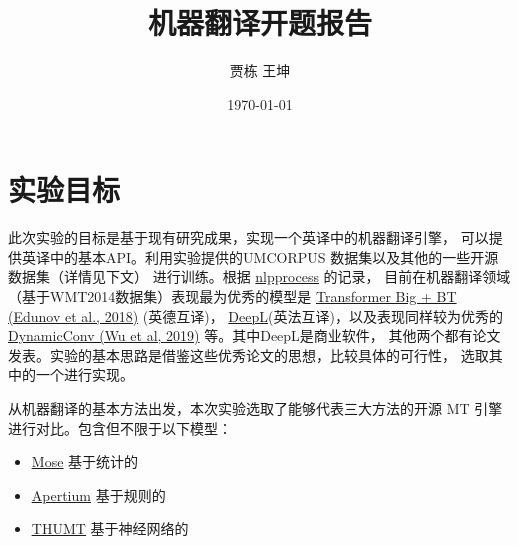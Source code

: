 \documentclass[UTF8,a4paper,10pt]{ctexart}
\title{\textbf{机器翻译开题报告}}
\author{贾栋\; 王坤}
\date{\today}
\begin{document}
    \maketitle


\begingroup %
\color{black}%
\renewcommand{\contentsname}{目录}
\tableofcontents
\newpage
\endgroup   %
 


\section{实验目标}


此次实验的目标是基于现有研究成果，实现一个英译中的机器翻译引擎，
可以提供英译中的基本API。利用实验提供的UMCORPUS 数据集以及其他的一些开源数据集（详情见下文）
进行训练。根据 \href{http://nlpprogress.com/english/machine_translation.html}{\color{blue}nlpprocess} 的记录，
目前在机器翻译领域（基于WMT2014数据集）表现最为优秀的模型是 \href{https://arxiv.org/pdf/1808.09381.pdf}{\color{blue}Transformer Big + BT (Edunov et al., 2018)} (英德互译)，
\href{https://www.deepl.com/press.html}{\color{blue}DeepL}(英法互译)，以及表现同样较为优秀的 \href{https://arxiv.org/abs/1901.10430.pdf}{\color{blue}DynamicConv (Wu et al, 2019)}
等。其中DeepL是商业软件，
  其他两个都有论文发表。实验的基本思路是借鉴这些优秀论文的思想，比较具体的可行性，
  选取其中的一个进行实现。

  从机器翻译的基本方法出发，本次实验选取了能够代表三大方法的开源 MT 引擎进行对比。包含但不限于以下模型：
\begin{itemize}

\item[$$$\bullet$] \href{http://www.statmt.org/moses/?n=Moses.Overview}{\color{blue}\underline{Mose}}  基于统计的 

\item[$\bullet$] \href{https://github.com/apertium}{\color{blue}\underline{Apertium}}                基于规则的

\item[$\bullet$] \href{http://thumt.thunlp.org/}{\color{blue}\underline{THUMT}}                     基于神经网络的
\end{itemize}
   
\end{document}
